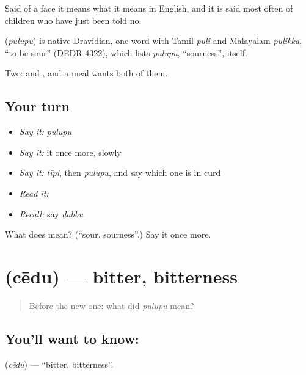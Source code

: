 Said of a face it means what it means in English, and it is said most often of children who have just been told no.

\begin{cousinweb}
\textbf{} (\emph{pulupu}) is native Dravidian, one word with Tamil \emph{puḷi} and Malayalam \emph{puḷikka}, \textquotedblleft{}to be sour\textquotedblright{} (DEDR 4322), which lists \emph{pulupu}, \textquotedblleft{}sourness\textquotedblright{}, itself.
\end{cousinweb}

\begin{grammarlens}[title={What you've built}]
Two:  and , and a meal wants both of them.
\end{grammarlens}

\subsection*{Your turn}
\begin{itemize}
\raggedright
  \item \emph{Say it:} \emph{pulupu}
  \item \emph{Say it:} it once more, slowly
  \item \emph{Say it:} \emph{tīpi}, then \emph{pulupu}, and say which one is in curd
  \item \emph{Read it:} \textbf{}
  \item \emph{Recall:} say \emph{ḍabbu}
\end{itemize}

\begin{tcolorbox}[breakable,colback=teal!4,colframe=teal!35!black,title={Before you move on}]
What does  mean? (\textquotedblleft{}sour, sourness\textquotedblright{}.) Say it once more.
\end{tcolorbox}
\section[\texorpdfstring{\te{చేదు} (cēdu)}{చేదు (cēdu)}]{ (cēdu) — bitter, bitterness}

\label{lesson:TE-C73-bitter}



\begin{quote}
Before the new one: what did \emph{pulupu} mean?
\end{quote}

\subsection*{You'll want to know: }
\textbf{} (\emph{cēdu}) — \textquotedblleft{}bitter, bitterness\textquotedblright{}.

